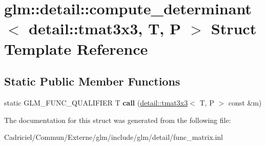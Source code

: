 \hypertarget{structglm_1_1detail_1_1compute__determinant_3_01detail_1_1tmat3x3_00_01_t_00_01_p_01_4}{}\section{glm\+:\+:detail\+:\+:compute\+\_\+determinant$<$ detail\+:\+:tmat3x3, T, P $>$ Struct Template Reference}
\label{structglm_1_1detail_1_1compute__determinant_3_01detail_1_1tmat3x3_00_01_t_00_01_p_01_4}
\subsection*{Static Public Member Functions}
\begin{DoxyCompactItemize}
\item 
static G\+L\+M\+\_\+\+F\+U\+N\+C\+\_\+\+Q\+U\+A\+L\+I\+F\+I\+ER T {\bfseries call} (\hyperlink{structglm_1_1detail_1_1tmat3x3}{detail\+::tmat3x3}$<$ T, P $>$ const \&m)\hypertarget{structglm_1_1detail_1_1compute__determinant_3_01detail_1_1tmat3x3_00_01_t_00_01_p_01_4_aacdeab0c051558a445f3f674dd6a5e8b}{}\label{structglm_1_1detail_1_1compute__determinant_3_01detail_1_1tmat3x3_00_01_t_00_01_p_01_4_aacdeab0c051558a445f3f674dd6a5e8b}

\end{DoxyCompactItemize}


The documentation for this struct was generated from the following file\+:\begin{DoxyCompactItemize}
\item 
Cadriciel/\+Commun/\+Externe/glm/include/glm/detail/func\+\_\+matrix.\+inl\end{DoxyCompactItemize}
